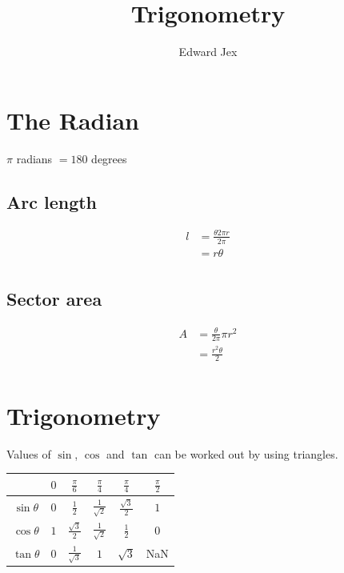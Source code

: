 \documentclass[a4paper,12pt]{article}
\begin{document}
\title{Trigonometry}	
\author{Edward Jex}
\maketitle
\section*{The Radian}
$\pi$ radians $= 180$ degrees \\ 
\subsection*{Arc length}
\begin{align*}
l & = \frac{\theta 2 \pi r}{2 \pi} \\
& = r \theta \\
\end{align*}
\subsection*{Sector area} 
\begin{align*}
A & = \frac{\theta}{2 \pi} \pi r^2 \\
& = \frac{r^2 \theta}{2} \\
\end{align*}
\section*{Trigonometry}
Values of $\sin$, $\cos$ and $\tan$ can be worked out by using triangles.

\begin{center}
\begin{tabular}{ c | c c c c c }
\hline
	 & $0$ & $\frac{\pi}{6}$ & $\frac{\pi}{4}$ & $\frac{\pi}{4}$ & $\frac{\pi}{2}$ \\ 
\hline
	$\sin \theta$ & $0$ & $\frac{1}{2}$ & $\frac{1}{\sqrt{2}}$ & $\frac{\sqrt{3}}{2}$ & $1$ \\ 
	$\cos \theta$ & $1$ & $\frac{\sqrt{3}}{2}$ & $\frac{1}{\sqrt{2}}$ & $\frac{1}{2}$ & $0$ \\ 
	$\tan \theta$ & $0$ & $\frac{1}{\sqrt{3}}$ & $1$ & $\sqrt{3}$ & NaN \\ 
\hline
\end{tabular}
\end{center}
\end{document}
